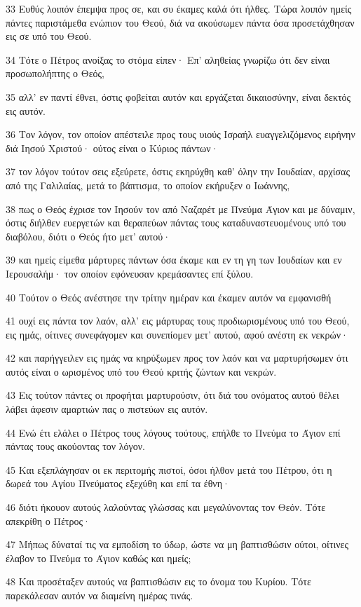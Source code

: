 \par 33 Ευθύς λοιπόν έπεμψα προς σε, και συ έκαμες καλά ότι ήλθες. Τώρα λοιπόν ημείς πάντες παριστάμεθα ενώπιον του Θεού, διά να ακούσωμεν πάντα όσα προσετάχθησαν εις σε υπό του Θεού.
\par 34 Τότε ο Πέτρος ανοίξας το στόμα είπεν· Επ' αληθείας γνωρίζω ότι δεν είναι προσωπολήπτης ο Θεός,
\par 35 αλλ' εν παντί έθνει, όστις φοβείται αυτόν και εργάζεται δικαιοσύνην, είναι δεκτός εις αυτόν.
\par 36 Τον λόγον, τον οποίον απέστειλε προς τους υιούς Ισραήλ ευαγγελιζόμενος ειρήνην διά Ιησού Χριστού· ούτος είναι ο Κύριος πάντων·
\par 37 τον λόγον τούτον σεις εξεύρετε, όστις εκηρύχθη καθ' όλην την Ιουδαίαν, αρχίσας από της Γαλιλαίας, μετά το βάπτισμα, το οποίον εκήρυξεν ο Ιωάννης,
\par 38 πως ο Θεός έχρισε τον Ιησούν τον από Ναζαρέτ με Πνεύμα Άγιον και με δύναμιν, όστις διήλθεν ευεργετών και θεραπεύων πάντας τους καταδυναστευομένους υπό του διαβόλου, διότι ο Θεός ήτο μετ' αυτού·
\par 39 και ημείς είμεθα μάρτυρες πάντων όσα έκαμε και εν τη γη των Ιουδαίων και εν Ιερουσαλήμ· τον οποίον εφόνευσαν κρεμάσαντες επί ξύλου.
\par 40 Τούτον ο Θεός ανέστησε την τρίτην ημέραν και έκαμεν αυτόν να εμφανισθή
\par 41 ουχί εις πάντα τον λαόν, αλλ' εις μάρτυρας τους προδιωρισμένους υπό του Θεού, εις ημάς, οίτινες συνεφάγομεν και συνεπίομεν μετ' αυτού, αφού ανέστη εκ νεκρών·
\par 42 και παρήγγειλεν εις ημάς να κηρύξωμεν προς τον λαόν και να μαρτυρήσωμεν ότι αυτός είναι ο ωρισμένος υπό του Θεού κριτής ζώντων και νεκρών.
\par 43 Εις τούτον πάντες οι προφήται μαρτυρούσιν, ότι διά του ονόματος αυτού θέλει λάβει άφεσιν αμαρτιών πας ο πιστεύων εις αυτόν.
\par 44 Ενώ έτι ελάλει ο Πέτρος τους λόγους τούτους, επήλθε το Πνεύμα το Άγιον επί πάντας τους ακούοντας τον λόγον.
\par 45 Και εξεπλάγησαν οι εκ περιτομής πιστοί, όσοι ήλθον μετά του Πέτρου, ότι η δωρεά του Αγίου Πνεύματος εξεχύθη και επί τα έθνη·
\par 46 διότι ήκουον αυτούς λαλούντας γλώσσας και μεγαλύνοντας τον Θεόν. Τότε απεκρίθη ο Πέτρος·
\par 47 Μήπως δύναταί τις να εμποδίση το ύδωρ, ώστε να μη βαπτισθώσιν ούτοι, οίτινες έλαβον το Πνεύμα το Άγιον καθώς και ημείς;
\par 48 Και προσέταξεν αυτούς να βαπτισθώσιν εις το όνομα του Κυρίου. Τότε παρεκάλεσαν αυτόν να διαμείνη ημέρας τινάς.

